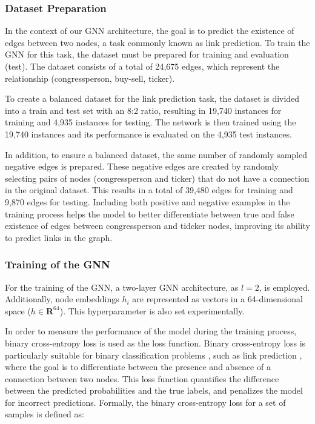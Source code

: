 \documentclass[15pt,letterpaper]{article}
\begin{document}
\subsubsection{Dataset Preparation}

In the context of our GNN architecture, the goal is to predict the existence of edges between two nodes, a task commonly known as link prediction. To train the GNN for this task, the dataset must be prepared for training and evaluation (test). The dataset consists of a total of 24,675 edges, which represent the relationship (congressperson, buy-sell, ticker).

To create a balanced dataset for the link prediction task, the dataset is divided into a train and test set with an 8:2 ratio, resulting in 19,740 instances for training and 4,935 instances for testing. The network is then trained using the 19,740 instances and its performance is evaluated on the 4,935 test instances.

In addition, to ensure a balanced dataset, the same number of randomly sampled negative edges \citep{nns} is prepared. These negative edges are created by randomly selecting pairs of nodes (congressperson and ticker) that do not have a connection in the original dataset. This results in a total of 39,480 edges for training and 9,870 edges for testing. Including both positive and negative examples in the training process helps the model to better differentiate between true and false existence of edges between congressperson and tidcker nodes, improving its ability to predict links in the graph.

\subsubsection{Training of the GNN}

For the training of the GNN, a two-layer GNN architecture, as $l=2$, is employed. Additionally, node embeddings $h_i$ are represented as vectors in a 64-dimensional space ($h \in \mathbf{R}^{64}$). This hyperparameter is also set experimentally.

In order to measure the performance of the model during the training process, binary cross-entropy loss is used as the loss function. Binary cross-entropy loss is particularly suitable for binary classification problems \citep{bcsec}, such as link prediction \citep{lp}, where the goal is to differentiate between the presence and absence of a connection between two nodes. This loss function quantifies the difference between the predicted probabilities and the true labels, and penalizes the model for incorrect predictions. Formally, the binary cross-entropy loss for a set of samples is defined as:
\end{document}
